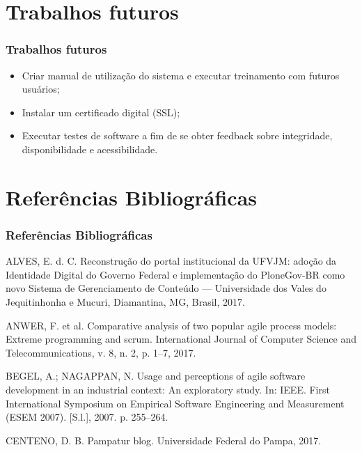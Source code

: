 \documentclass{beamer}
\begin{document}
\section{Trabalhos futuros}
\begin{frame}
    \frametitle{Trabalhos futuros}
    \begin{itemize}
        \item Criar manual de utilização do sistema e executar treinamento com futuros usuários;
        \item Instalar um certificado digital (SSL); %
        \item Executar testes de software a fim de se obter feedback sobre integridade, disponibilidade e acessibilidade. %
    \end{itemize}

    
\end{frame}

    

\section{Referências Bibliográficas}

\begin{frame}
    \frametitle{Referências Bibliográficas}
    \scriptsize{
        ALVES, E. d. C. Reconstrução do portal institucional da UFVJM: adoção da Identidade Digital do Governo Federal e implementação do PloneGov-BR como novo Sistema de Gerenciamento de Conteúdo — Universidade dos Vales do Jequitinhonha e Mucuri, Diamantina, MG, Brasil, 2017. \newline

        ANWER, F. et al. Comparative analysis of two popular agile process models: Extreme programming and scrum. International Journal of Computer Science and Telecommunications, v. 8, n. 2, p. 1–7, 2017. \newline

        BEGEL, A.; NAGAPPAN, N. Usage and perceptions of agile software development in an industrial context: An exploratory study. In: IEEE. First International Symposium on Empirical Software Engineering and Measurement (ESEM 2007). [S.l.], 2007. p. 255–264. \newline

        CENTENO, D. B. Pampatur blog. Universidade Federal do Pampa, 2017. \newline
}
\end{frame}
\end{document}
